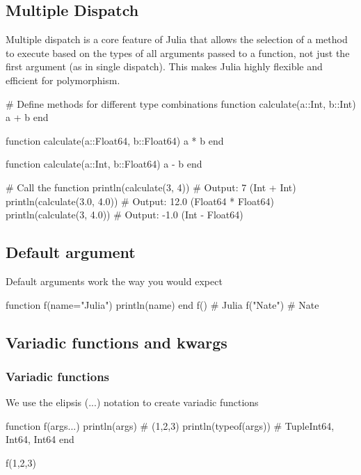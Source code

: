 \documentclass{report}
\begin{document}
    \subsection{Multiple Dispatch}
    \bigbreak \noindent 
    Multiple dispatch is a core feature of Julia that allows the selection of a method to execute based on the types of all arguments passed to a function, not just the first argument (as in single dispatch). This makes Julia highly flexible and efficient for polymorphism.
    \bigbreak \noindent 
    \begin{jlcode}
    # Define methods for different type combinations
    function calculate(a::Int, b::Int)
        a + b
    end

    function calculate(a::Float64, b::Float64)
        a * b
    end

    function calculate(a::Int, b::Float64)
        a - b
    end

    # Call the function
    println(calculate(3, 4))       # Output: 7 (Int + Int)
    println(calculate(3.0, 4.0))   # Output: 12.0 (Float64 * Float64)
    println(calculate(3, 4.0))     # Output: -1.0 (Int - Float64)
    \end{jlcode}

    \bigbreak \noindent 
    \subsection{Default argument}
    \bigbreak \noindent 
    Default  arguments work the way you would expect
    \bigbreak \noindent 
    \begin{jlcode}
    function f(name="Julia")
        println(name)
    end
    f() # Julia
    f("Nate") # Nate
    \end{jlcode}

    \bigbreak \noindent 
    \subsection{Variadic functions and kwargs}
    \bigbreak \noindent 
    \subsubsection{Variadic functions}
    \bigbreak \noindent 
    We use the elipsis (...) notation to create variadic functions
    \bigbreak \noindent 
    \begin{jlcode}
    function f(args...)
        println(args) # (1,2,3)
        println(typeof(args)) # Tuple{Int64, Int64, Int64}
    end

    f(1,2,3)
    \end{jlcode}
\end{document}
